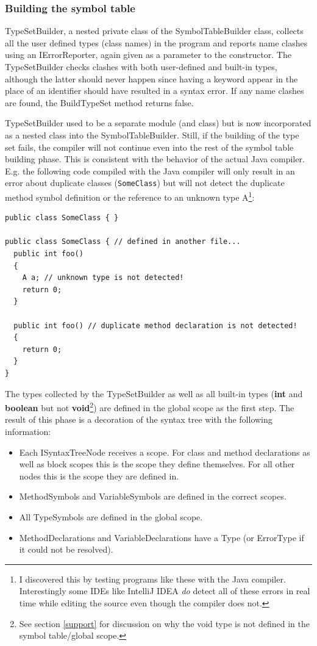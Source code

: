 \documentclass[a4paper,11pt]{article}
\begin{document}
\subsubsection{Building the symbol table}

TypeSetBuilder, a nested private class of the SymbolTableBuilder class, collects all the user defined types (class names) in the program and reports name clashes using an IErrorReporter, again given as a parameter to the constructor. The TypeSetBuilder checks clashes with both user-defined and built-in types, although the latter should never happen since having a keyword appear in the place of an identifier should have resulted in a syntax error. If any name clashes are found, the BuildTypeSet method returns false.

TypeSetBuilder used to be a separate module (and class) but is now incorporated as a nested class into the SymbolTableBuilder. Still, if the building of the type set fails, the compiler will not continue even into the rest of the symbol table building phase. This is consistent with the behavior of the actual Java compiler. E.g. the following code compiled with the Java compiler will only result in an error about duplicate classes (\verb,SomeClass,) but will not detect the duplicate method symbol definition or the reference to an unknown type A\footnote{I discovered this by testing programs like these with the Java compiler. Interestingly some IDEs like IntelliJ IDEA \emph{do} detect all of these errors in real time while editing the source even though the compiler does not.}:
\begin{verbatim}
public class SomeClass { }

public class SomeClass { // defined in another file...
  public int foo()
  {
    A a; // unknown type is not detected!
    return 0;
  }

  public int foo() // duplicate method declaration is not detected!
  {
    return 0;
  }
}
\end{verbatim}

The types collected by the TypeSetBuilder as well as all built-in types (\textbf{int} and \textbf{boolean} but not \textbf{void}\footnote{See section \ref{support} for discussion on why the void type is not defined in the symbol table/global scope.}) are defined in the global scope as the first step. The result of this phase is a decoration of the syntax tree with the following information:

\begin{itemize}
    \item Each ISyntaxTreeNode receives a scope. For class and method declarations as well as block scopes this is the scope they define themselves. For all other nodes this is the scope they are defined in.
    \item MethodSymbols and VariableSymbols are defined in the correct scopes.
    \item All TypeSymbols are defined in the global scope.
    \item MethodDeclarations and VariableDeclarations have a Type (or ErrorType if it could not be resolved).
\end{itemize}
\end{document}
